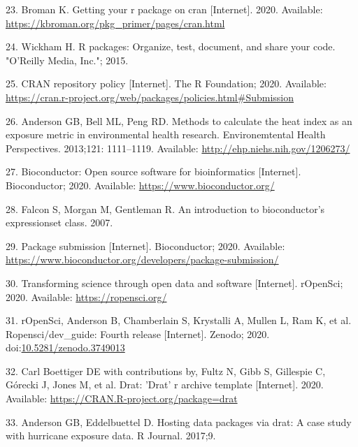 \documentclass[10pt,letterpaper]{article}
\begin{document}
\leavevmode\hypertarget{ref-broman2020}{}%
23. Broman K. Getting your r package on cran {[}Internet{]}. 2020.
Available: \url{https://kbroman.org/pkg_primer/pages/cran.html}

\leavevmode\hypertarget{ref-wickham2015}{}%
24. Wickham H. R packages: Organize, test, document, and share your
code. "O'Reilly Media, Inc."; 2015.

\leavevmode\hypertarget{ref-cranpolicy2020}{}%
25. CRAN repository policy {[}Internet{]}. The R Foundation; 2020.
Available:
\url{https://cran.r-project.org/web/packages/policies.html\#Submission}

\leavevmode\hypertarget{ref-weathermetrics}{}%
26. Anderson GB, Bell ML, Peng RD. Methods to calculate the heat index
as an exposure metric in environmental health research. Environemtental
Health Perspectives. 2013;121: 1111--1119. Available:
\url{http://ehp.niehs.nih.gov/1206273/}

\leavevmode\hypertarget{ref-bioconductor}{}%
27. Bioconductor: Open source software for bioinformatics
{[}Internet{]}. Bioconductor; 2020. Available:
\url{https://www.bioconductor.org/}

\leavevmode\hypertarget{ref-falcon2007}{}%
28. Falcon S, Morgan M, Gentleman R. An introduction to bioconductor's
expressionset class. 2007.

\leavevmode\hypertarget{ref-biocpkgsub2020}{}%
29. Package submission {[}Internet{]}. Bioconductor; 2020. Available:
\url{https://www.bioconductor.org/developers/package-submission/}

\leavevmode\hypertarget{ref-ropensci2020}{}%
30. Transforming science through open data and software {[}Internet{]}.
rOpenSci; 2020. Available: \url{https://ropensci.org/}

\leavevmode\hypertarget{ref-ropenscidev2020}{}%
31. rOpenSci, Anderson B, Chamberlain S, Krystalli A, Mullen L, Ram K,
et al. Ropensci/dev\_guide: Fourth release {[}Internet{]}. Zenodo; 2020.
doi:\href{https://doi.org/10.5281/zenodo.3749013}{10.5281/zenodo.3749013}

\leavevmode\hypertarget{ref-drat}{}%
32. Carl Boettiger DE with contributions by, Fultz N, Gibb S, Gillespie
C, Górecki J, Jones M, et al. Drat: 'Drat' r archive template
{[}Internet{]}. 2020. Available:
\url{https://CRAN.R-project.org/package=drat}

\leavevmode\hypertarget{ref-anderson2017}{}%
33. Anderson GB, Eddelbuettel D. Hosting data packages via drat: A case
study with hurricane exposure data. R Journal. 2017;9.
\end{document}
